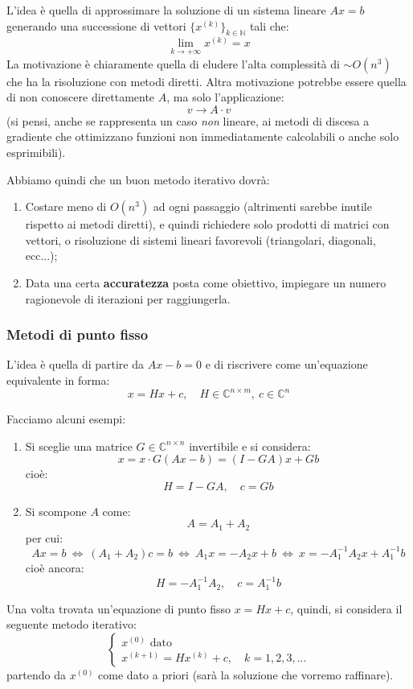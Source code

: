 \documentclass[a4paper,11pt]{article}
\begin{document}
L'idea è quella di approssimare la soluzione di un sistema lineare $Ax = b$ generando una successione di vettori $\{ x^{(k)} \}_{k \in \mathbb{N}}$ tali che:
$$
\lim_{k \rightarrow +\infty} x^{(k)} = x
$$
La motivazione è chiaramente quella di eludere l'alta complessità di $\sim O(n^3)$ che ha la risoluzione con metodi diretti.
Altra motivazione potrebbe essere quella di non conoscere direttamente $A$, ma solo l'applicazione:
$$
v \rightarrow A \cdot v
$$
(si pensi, anche se rappresenta un caso \textit{non} lineare, ai metodi di discesa a gradiente che ottimizzano funzioni non immediatamente calcolabili o anche solo esprimibili).

Abbiamo quindi che un buon metodo iterativo dovrà:
\begin{enumerate}
	\item Costare meno di $O(n^3)$ ad ogni passaggio (altrimenti sarebbe inutile rispetto ai metodi diretti), e quindi richiedere solo prodotti di matrici con vettori, o risoluzione di sistemi lineari favorevoli (triangolari, diagonali, ecc...);
	
	\item Data una certa \textbf{accuratezza} posta come obiettivo, impiegare un numero ragionevole di iterazioni per raggiungerla.
\end{enumerate}

\subsubsection{Metodi di punto fisso}
L'idea è quella di partire da $Ax - b = 0$ e di riscrivere come un'equazione equivalente in forma:
$$
x = Hx + c, \quad H \in \mathbb{C}^{n \times m}, \ c \in \mathbb{C}^n
$$

Facciamo alcuni esempi:
\begin{enumerate}
	\item Si sceglie una matrice $G \in \mathbb{C}^{n \times n}$ invertibile e si considera:
		$$
		x = x \cdot G(Ax - b) = (I - GA) x + Gb
		$$
		cioè:
		$$
		H = I - GA, \quad c = Gb
		$$

	\item Si scompone $A$ come:
		$$
		A = A_1 + A_2
		$$
		per cui:
		$$
		Ax = b \ \Leftrightarrow \ (A_1 + A_2) c = b \ \Leftrightarrow \ A_1 x = - A_2 x + b \ \Leftrightarrow \ x = -A_1^{-1} A_2 x + A_1^{-1} b
		$$
		cioè ancora:
		$$
		H = -A_1^{-1}A_2 , \quad c = A_1^{-1} b
		$$
\end{enumerate}

Una volta trovata un'equazione di punto fisso $x = H x + c$, quindi, si considera il seguente metodo iterativo:
\[
	\begin{cases}
		x^{(0)} \text{ dato} \\
		x^{(k + 1)} = H x^{(k)} + c, \quad k = 1, 2, 3, ...
	\end{cases}
\]
partendo da $x^{(0)}$ come dato a priori (sarà la soluzione che vorremo raffinare).
\end{document}
